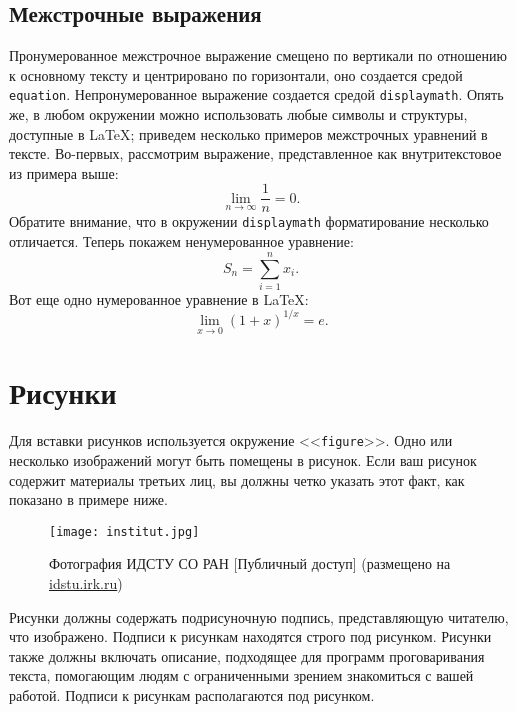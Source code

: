\documentclass[
12pt,
polyglossia,   %
firacode,    %
wordmath,      %
russian        %
]{isdctart}
\begin{document}
\subsection{Межстрочные выражения}

Пронумерованное межстрочное выражение смещено по вертикали по отношению к основному тексту и центрировано по горизонтали, оно создается средой \verb|equation|. Непронумерованное выражение создается средой \verb|displaymath|.  Опять же, в любом окружении можно использовать любые символы и структуры, доступные в \LaTeX{}; приведем несколько примеров межстрочных уравнений в тексте. Во-первых, рассмотрим выражение, представленное как внутритекстовое из примера выше:
\begin{equation}
  \lim_{n\rightarrow \infty} \frac{1}{n} = 0.
\end{equation}
Обратите внимание, что в окружении \verb|displaymath| форматирование несколько отличается. Теперь покажем ненумерованное уравнение:
\begin{displaymath}
  S_{n} = \sum_{i=1}^{n} x_{i}.
\end{displaymath}
Вот еще одно нумерованное уравнение в \LaTeX:
\begin{equation}
  \lim_{x \to 0} (1 + x)^{1/x} = e.
\end{equation}

\section{Рисунки}

Для вставки рисунков используется окружение <<\verb|figure|>>. Одно или несколько изображений могут быть помещены в рисунок. Если ваш рисунок содержит материалы третьих лиц, вы должны четко указать этот факт, как показано в примере ниже.
\begin{figure}
  \centering
  \texttt{[image: institut.jpg]}
  \caption{Фотография ИДСТУ СО РАН [Публичный доступ] (размещено на \url{idstu.irk.ru}) }
\end{figure}

Рисунки должны содержать подрисуночную подпись, представляющую читателю, что изображено. Подписи к рисункам находятся строго под рисунком. Рисунки также должны включать описание, подходящее для программ проговаривания текста, помогающим людям с ограниченными зрением знакомиться с вашей работой.  Подписи к рисункам располагаются под рисунком.
\end{document}
